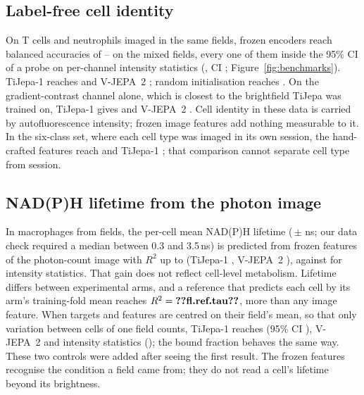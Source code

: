 \subsection{Label-free cell identity}
On T cells and neutrophils imaged in the same fields, frozen encoders reach balanced
accuracies of -- on the 
mixed fields, every one of them inside the 95\% CI of a probe on per-channel intensity
statistics (, CI ;
Figure~\ref{fig:benchmarks}). TiJepa-1 reaches
 and V-JEPA~2 ; random
initialisation reaches . On the gradient-contrast
channel alone, which is closest to the brightfield TiJepa was trained on, TiJepa-1 gives
 and V-JEPA~2 . Cell identity in
these data is carried by autofluorescence intensity; frozen image features add nothing measurable
to it. In the six-class set, where each cell type was imaged in its own session, the
hand-crafted features reach  and TiJepa-1
; that comparison cannot separate cell type from session.

\subsection{NAD(P)H lifetime from the photon image}
In  macrophages from  fields, the per-cell mean NAD(P)H lifetime
(\,$\pm$\,\,ns; our data check required a median between
0.3 and 3.5\,ns)
is predicted from frozen features of the photon-count image with $R^2$ up to
 (TiJepa-1 , V-JEPA~2
), against  for intensity statistics.
That gain does not reflect cell-level metabolism. Lifetime differs between experimental
arms, and a reference that predicts each cell by its arm's training-fold mean reaches
$R^2=\val{fl.ref.tau}$, more than any image feature. When targets and features are centred
on their field's mean, so that only variation between cells of one field counts, TiJepa-1
reaches  (95\% CI ), V-JEPA~2
 and intensity statistics 
(); the bound fraction behaves the same way. These two
controls were added after seeing the first result. The frozen features recognise the
condition a field came from; they do not read a cell's lifetime beyond its brightness.

